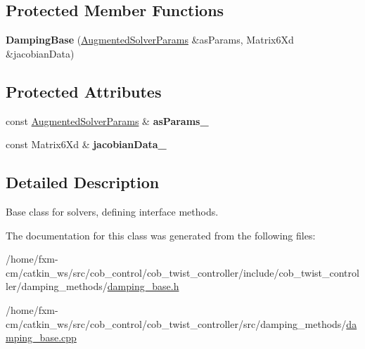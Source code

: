 \subsection*{Protected Member Functions}
\begin{DoxyCompactItemize}
\item 
\hypertarget{classDampingBase_a896950a881805c92878f7888e8d5362a}{{\bfseries Damping\-Base} (\hyperlink{structAugmentedSolverParams}{Augmented\-Solver\-Params} \&as\-Params, Matrix6\-Xd \&jacobian\-Data)}\label{classDampingBase_a896950a881805c92878f7888e8d5362a}

\end{DoxyCompactItemize}
\subsection*{Protected Attributes}
\begin{DoxyCompactItemize}
\item 
\hypertarget{classDampingBase_af7a090118a27826f63f51e3b850104e1}{const \hyperlink{structAugmentedSolverParams}{Augmented\-Solver\-Params} \& {\bfseries as\-Params\-\_\-}}\label{classDampingBase_af7a090118a27826f63f51e3b850104e1}

\item 
\hypertarget{classDampingBase_ad5194f9da74dae956b2ce5daff659ce3}{const Matrix6\-Xd \& {\bfseries jacobian\-Data\-\_\-}}\label{classDampingBase_ad5194f9da74dae956b2ce5daff659ce3}

\end{DoxyCompactItemize}


\subsection{Detailed Description}
Base class for solvers, defining interface methods. 

The documentation for this class was generated from the following files\-:\begin{DoxyCompactItemize}
\item 
/home/fxm-\/cm/catkin\-\_\-ws/src/cob\-\_\-control/cob\-\_\-twist\-\_\-controller/include/cob\-\_\-twist\-\_\-controller/damping\-\_\-methods/\hyperlink{damping__base_8h}{damping\-\_\-base.\-h}\item 
/home/fxm-\/cm/catkin\-\_\-ws/src/cob\-\_\-control/cob\-\_\-twist\-\_\-controller/src/damping\-\_\-methods/\hyperlink{damping__base_8cpp}{damping\-\_\-base.\-cpp}\end{DoxyCompactItemize}

